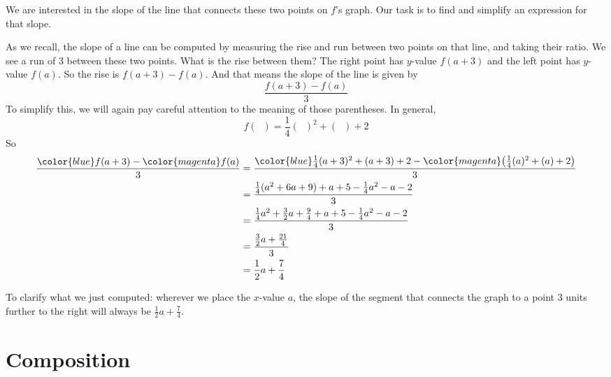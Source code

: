 \begin{pccexample}
We are interested in the slope of the line that connects these two points on $f$'s graph. Our task is to find and simplify an expression for that slope.

\begin{pccsolution} As we recall, the slope of a line can be computed by measuring the rise and run between two points on that line, and taking their ratio. We see a run of \num{3} between these two points. What is the rise between them? The right point has $y$-value $f(a+3)$ and the left point has $y$-value $f(a)$. So the rise is $f(a+3)-f(a)$. And that means the slope of the line is given by
\[\frac{f(a+3)-f(a)}{3}\]
To simplify this, we will again pay careful attention to the meaning of those parentheses. In general,
\[f(\phantom{x})=\frac{1}{4}(\phantom{x})^2+(\phantom{x})+2\]
So
\begin{align*}
\frac{{\color{blue}f(a+3)}-{\color{magenta}f(a)}}{3}
&=\frac{{\color{blue}\frac{1}{4}(a+3)^2+(a+3)+2}-{\color{magenta}\big(\frac{1}{4}(a)^2+(a)+2\big)}}{3}\\
&=\frac{\frac{1}{4}(a^2+6a+9)+a+5-\frac{1}{4}a^2-a-2}{3}\\
&=\frac{\frac{1}{4}a^2+\frac32a+\frac94+a+5-\frac{1}{4}a^2-a-2}{3}\\
&=\frac{\frac32a+\frac{21}4}{3}\\
&=\frac12a+\frac{7}4
\end{align*}

To clarify what we just computed: wherever we place the $x$-value $a$, the slope of the segment that connects the graph to a point \num{3} units further to the right will always be $\frac12a+\frac{7}4$.
\end{pccsolution}
\end{pccexample}





\section{Composition}


